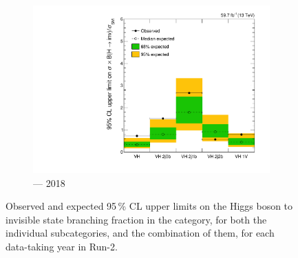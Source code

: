 \begin{figure}[htbp]
    \begin{subfigure}[b]{0.45\textwidth}
        \includegraphics[width=\textwidth]{chapters/higgstoinv/figures/limits/VH/limit_2018_VH.pdf}
        \caption{\VH --- 2018}
    \end{subfigure}
    \caption[Observed and expected 95\,\% CL upper limits on the Higgs boson to invisible state branching fraction in the \VH category, for both the individual subcategories, and the combination of them, for each data-taking year in Run-2]{Observed and expected 95\,\% CL upper limits on the Higgs boson to invisible state branching fraction in the \VH category, for both the individual subcategories, and the combination of them, for each data-taking year in Run-2.}
    \label{fig:htoinv_limit_VH_per_year}
\end{figure}

